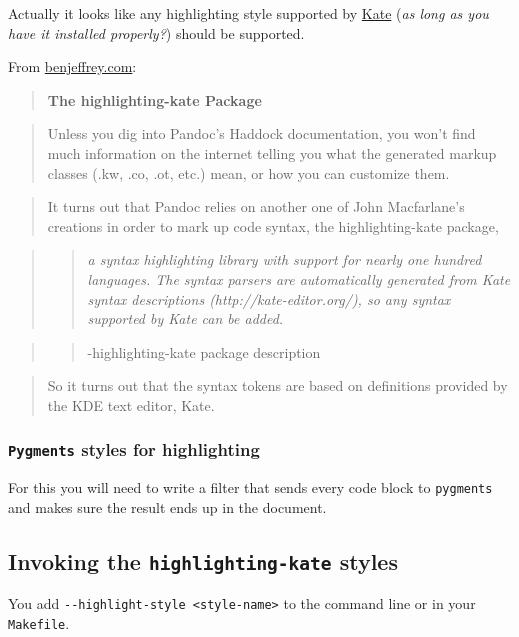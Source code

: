 \documentclass[letterpaper]{scrartcl}
\begin{document}
Actually it looks like any highlighting style supported by
\href{http://kate-editor.org/}{Kate} (\emph{as long as you have it
installed properly?}) should be supported.

From
\href{https://benjeffrey.com/pandoc-syntax-highlighting-css}{benjeffrey.com}:

\begin{quote}
\textbf{The highlighting-kate Package}
\end{quote}

\begin{quote}
Unless you dig into Pandoc's Haddock documentation, you won't find much
information on the internet telling you what the generated markup
classes (.kw, .co, .ot, etc.) mean, or how you can customize them.
\end{quote}

\begin{quote}
It turns out that Pandoc relies on another one of John Macfarlane's
creations in order to mark up code syntax, the highlighting-kate
package,
\end{quote}

\begin{quote}
\begin{quote}
\emph{a syntax highlighting library with support for nearly one hundred
languages. The syntax parsers are automatically generated from Kate
syntax descriptions (http://kate-editor.org/), so any syntax supported
by Kate can be added.}
\end{quote}
\end{quote}

\begin{quote}
\begin{quote}
-highlighting-kate package description
\end{quote}
\end{quote}

\begin{quote}
So it turns out that the syntax tokens are based on definitions provided
by the KDE text editor, Kate.
\end{quote}

\subsubsection{\texttt{Pygments} styles for
highlighting}\label{pygments-styles-for-highlighting}

For this you will need to write a filter that sends every code block to
\texttt{pygments} and makes sure the result ends up in the document.

\subsection{Invoking the \texttt{highlighting-kate}
styles}\label{invoking-the-highlighting-kate-styles}

You add \texttt{-\/-highlight-style \textless{}style-name\textgreater{}}
to the command line or in your \texttt{Makefile}.
\end{document}
